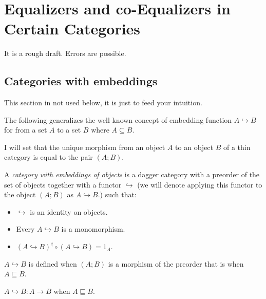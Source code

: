 \chapter{Equalizers and co-Equalizers in Certain Categories}

It is a rough draft. Errors are possible.


\section{Categories with embeddings}

\begin{note}
  This section in not used below, it is just to feed your intuition.
\end{note}

The following generalizes the well known concept of embedding function $A
\hookrightarrow B$ for from a set $A$ to a set $B$ where $A \subseteq B$.

I will set that the unique morphism from an object $A$ to an object $B$ of a
thin category is equal to the pair $(A ; B)$.

\begin{defn}
  A \emph{category with embeddings of objects} is a dagger category with a
  preorder of the set of objects together with a functor $\hookrightarrow$ (we
  will denote applying this functor to the object $(A ; B)$ as $A
  \hookrightarrow B$.) such that:
  \begin{itemize}
    \item $\hookrightarrow$ is an identity on objects.
    
    \item Every $A \hookrightarrow B$ is a monomorphism.
    
    \item $(A \hookrightarrow B)^{\dagger} \circ (A \hookrightarrow B) = 1_A$.
  \end{itemize}
\end{defn}

\begin{obvious}
$A\hookrightarrow B$ is defined when $(A ; B)$ is a morphism of the preorder
that is when $A \sqsubseteq B$.
\end{obvious}

\begin{obvious}
$A \hookrightarrow B : A \rightarrow B$ when $A \sqsubseteq B$.
\end{obvious}


